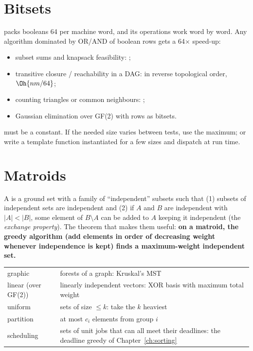 \section[Bitsets]{Bitsets \hfill \plat}

 packs booleans 64 per machine word, and its operations work word by word. Any algorithm dominated by OR/AND of
boolean rows gets a 64$\times$ speed-up:

\begin{itemize}
  \item subset sums and knapsack feasibility: ;
  \item transitive closure / reachability in a DAG:  in reverse topological order, $\Oh{nm/64}$;
  \item counting triangles or common neighbours: ;
  \item Gaussian elimination over GF(2) with rows as bitsets.
\end{itemize}

\begin{pitfall}
 must be a constant. If the needed size varies between tests, use the maximum; or write a template function
instantiated for a few sizes and dispatch at run time.
\end{pitfall}

\section[Matroids]{Matroids \hfill \ioi}

A  is a ground set with a family of ``independent'' subsets such that (1) subsets of independent sets are
independent and (2) if $A$ and $B$ are independent with $|A| < |B|$, some element of $B \setminus A$ can be added to $A$ keeping it
independent (the \emph{exchange property}). The theorem that makes them useful: \textbf{on a matroid, the greedy algorithm (add
elements in order of decreasing weight whenever independence is kept) finds a maximum-weight independent set.}

\begin{center}
\begin{tabularx}{\linewidth}{p{3.6cm}L}
\toprule
{} &  \\
\midrule
graphic & forests of a graph: Kruskal's MST \\
linear (over GF(2)) & linearly independent vectors: XOR basis with maximum total weight \\
uniform & sets of size $\le k$: take the $k$ heaviest \\
partition & at most $c_i$ elements from group $i$ \\
scheduling & sets of unit jobs that can all meet their deadlines: the deadline greedy of Chapter~\ref{ch:sorting} \\
\bottomrule
\end{tabularx}
\end{center}

